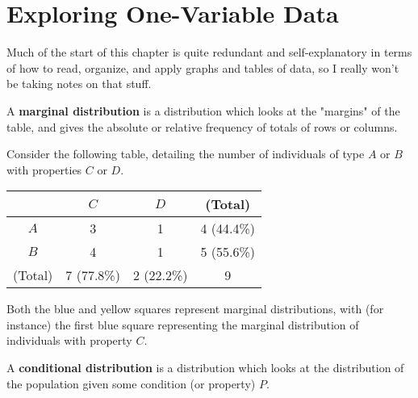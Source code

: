 \section{Exploring One-Variable Data}

Much of the start of this chapter is quite redundant and self-explanatory in
terms of how to read, organize, and apply graphs and tables of data, so I
really won't be taking notes on that stuff.

\begin{blackbox}
    \begin{definition}
        A \textbf{marginal distribution} is a distribution which looks at the "margins" of the table, and gives the absolute or relative frequency of totals of rows or columns.
    \end{definition}
\end{blackbox}

\begin{example}
    Consider the following table, detailing the number of individuals of type \( A \) or \( B \) with properties \( C \) or \( D \).

    \begin{center}
        \begin{tabular}{c|c|c|c}
            & \( C \) & \( D \) & (Total) \\
            \hline \( A \) & 3 & 1 & \cellcolor{yellow!30} 4 (44.4\%) \\
            \hline \( B \) & 4 & 1 & \cellcolor{yellow!30} 5 (55.6\%) \\
            \hline (Total) & \cellcolor{blue!20} 7 (77.8\%) & \cellcolor{blue!20} 2 (22.2\%) & 9
        \end{tabular}
    \end{center}

    Both the blue and yellow squares represent marginal distributions, with (for instance) the first blue square representing the marginal distribution of individuals with property \( C \).
\end{example}

\begin{blackbox}
    \begin{definition}
        A \textbf{conditional distribution} is a distribution which looks at the distribution of the population given some condition (or property) \( P \).
    \end{definition}
\end{blackbox}

